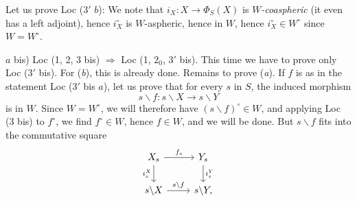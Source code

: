 \documentclass[11pt]{article}
\newcommand{\msp}[1]{\marginpar{\footnotesize [#1]}}
\begin{document}
Let us prove Loc ($3'$ $b$): We note that $i_X : X \longrightarrow \Phi_S(X)$ is $W$\textit{-coaspheric} (it even has a left adjoint), hence $i_X^\circ$ is $W$-aspheric, hence in $W$, hence $i_X^\circ \in W^\circ$ since $W = W^\circ$. %

$a$ bis) Loc (1, 2, 3 bis) $\Longrightarrow$ Loc (1, $2_0$, $3'$ bis). This time we have to prove only Loc ($3'$ bis). For (\textit{b}), this is already done. Remains to prove (\textit{a}). If $f$ is as in the statement Loc ($3'$ bis $a$), let us prove that for every $s$ in $S$, the induced morphism
\[
s\backslash f : s\backslash X \longrightarrow s\backslash Y
\]
is in $W$. Since $W = W^\circ$, we will therefore have $(s\backslash f)^\circ \in W$, and applying Loc (3 bis) to $f^\circ$, we find $f^\circ \in W$, hence $f \in W$, and we will be done. But $s\backslash f$ fits into the commutative square
\msp{page 6}
\[
\begin{tikzcd}
X_s \arrow[r, "f_s"] \arrow[d, "i_s^X"'] & Y_s \arrow[d, "i_s^Y"] \\
s\backslash X \arrow[r, "s\backslash f"] & s\backslash Y,
\end{tikzcd}
\]
\end{document}
